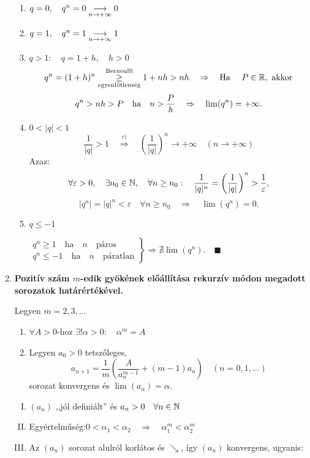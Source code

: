 \documentclass[a4paper,11.5pt]{article}
\begin{document}
\begin{enumerate}
		\biz
		\begin{enumerate}
			\item $q=0,\quad q^n=0\underset{n\rightarrow+\infty}{\longrightarrow}0$\quad \checkmark
			\item $q=1,\quad q^n=1\underset{n\rightarrow+\infty}{\longrightarrow}1$\quad \checkmark
			\item $q>1:\quad q=1+h,\quad  h>0$
			\[ q^n =(1+h)^n\overset{\text{Bernoulli}}{\underset{\text{egyenlőtlenség}}{\geq}}1+nh>nh\quad \Rightarrow\quad \text{Ha }\quad P\in\mathbb{R},\text{ akkor} \]
			\[ q^n>nh>P\text{\quad ha\quad }n>\frac{P}{h} \quad \Rightarrow \quad \lim(q^n)=+\infty.\]
			\item $0<|q|<1$
			\[ \frac{1}{|q|}>1\quad \overset{c)}{\Longrightarrow}\quad \left(\frac{1}{|q|}\right)^n\to+\infty\quad (n\to+\infty) \]
			Azaz:
			\[ \forall\varepsilon>0,\quad \exists n_0\in\mathbb{N}, \quad \forall n\geq n_0:\quad \frac{1}{|q|^n}=\left(\frac{1}{|q|}\right)^n>\frac{1}{\varepsilon}, \]
			\[ |q^n|=|q|^n<\varepsilon\quad \forall n\geq n_0\quad \Rightarrow\quad \lim(q^n)=0. \]
			\item $q\leq -1$
			
			$\left.\begin{gathered}
			q^n\geq1 \quad \text{ha}\quad  n \quad \text{páros} \\
			q^n\leq-1 \quad \text{ha}\quad n \quad \text{páratlan}
			\end{gathered}\right\} \Rightarrow$\quad $\nexists\lim(q^n).\quad \blacksquare$
			
		\end{enumerate}
		
		\item \textbf{Pozitív szám $m$-edik gyökének előállítása rekurzív módon megadott sorozatok határértékével.}
		
		Legyen $m=2,3,\ldots$
		\begin{enumerate}
			\item  $\forall A>0$-hoz $\exists!\alpha>0:\quad \alpha^m=A$
			\item Legyen $a_0>0$ tetszőleges,
			\[ a_{n+1}=\frac{1}{m}\left(\frac{A}{a_n^{m-1}}+(m-1)a_n\right)\quad (n=0,1,\ldots) \]
			sorozat konvergens és $\lim(a_n)=\alpha.$
		\end{enumerate}
		
		\biz
		\begin{enumerate}[I. lépés:]
			\item $(a_n)$ ,,jól definiált'' és $a_n>0\quad \forall n\in\mathbb{N}$
			\item Egyértelműség:\quad $0<\alpha_1<\alpha_2\quad \Rightarrow\quad \alpha_1^m<\alpha_2^m$
			\item Az $(a_n)$ sorozat alulról korlátos és $\searrow$, így $(a_n)$ konvergens, ugyanis:
			

\end{enumerate}
\end{enumerate}
\end{document}
